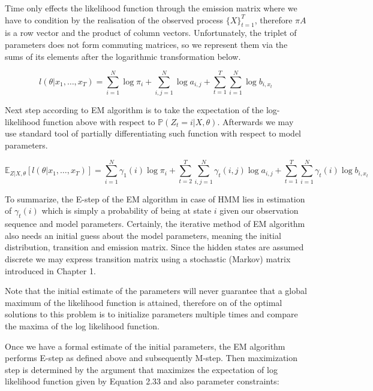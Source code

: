 Time only effects the likelihood function through the emission matrix where we have to condition by the realisation of the observed process $\{X\}_{t=1}^T$, therefore $\pi A$ is a row vector and the product of column vectors. Unfortunately, the triplet of parameters does not form commuting matrices, so we represent them via the sums of its elements after the logarithmic transformation below.

\begin{equation}
l(\theta|x_1,\ldots,x_T) = \sum_{i=1}^{N}  \log \pi_i + \sum_{i,j=1}^{N} \log a_{i,j}+ \sum_{t=1}^{T} \sum_{i=1}^{N} \log b_{i,x_t}
\end{equation}

Next step according to EM algorithm is to take the expectation of the log-likelihood function above with respect to $\mathbb{P}(Z_t=i|X,\theta)$. Afterwards we may use standard tool of partially differentiating such function with respect to model parameters.

\begin{equation}
\mathbb{E}_{Z|X,\theta} [l(\theta|x_1,\ldots,x_T)] = \sum_{i=1}^{N} \gamma_1(i) \log \pi_i + \sum_{t=2}^{T} \sum_{i,j=1}^{N} \gamma_t (i,j) \log a_{i,j}+ \sum_{t=1}^{T} \sum_{i=1}^{N} \gamma_t (i) \log b_{i,x_t}
\end{equation}

To summarize, the E-step of the EM algorithm in case of HMM lies in estimation of $\gamma_t(i)$ which is simply a probability of being at state $i$ given our observation sequence and model parameters. Certainly, the iterative method of EM algorithm also needs an initial guess about the model parameters, meaning the initial distribution, transition and emission matrix. Since the hidden states are assumed discrete we may express transition matrix using a stochastic (Markov) matrix introduced in Chapter 1.

Note that the initial estimate of the parameters will never guarantee that a global maximum of the likelihood function is attained, therefore on of the optimal solutions to this problem is to initialize parameters multiple times and compare the maxima of the log likelihood function. 

Once we have a formal estimate of the initial parameters, the EM algorithm performs E-step as defined above and subsequently M-step. Then maximization step is determined by the argument that maximizes the expectation of log likelihood function given by Equation 2.33 and also parameter constraints:

